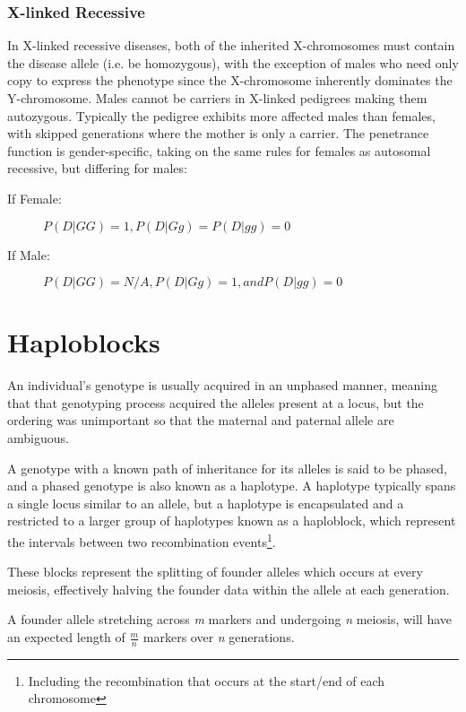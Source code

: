 \subsubsection{X-linked Recessive}

\label{ref:back:xlinkrec}

In X-linked recessive diseases, both of the inherited X-chromosomes must contain the disease allele (i.e. be homozygous), with the exception of males who need only copy to express the phenotype since the X-chromosome inherently dominates the Y-chromosome.  Males cannot be carriers in X-linked pedigrees making them \gls{autozygous}.
Typically the pedigree exhibits more affected males than females, with skipped generations where the mother is only a carrier. 
The penetrance function is gender-specific, taking on the same rules for females as autosomal recessive, but differing for males:

\begin{description}
\item[If Female:]{\(P(D|GG)=1, P(D|Gg) = P(D|gg)=0\)}
\item[If Male:]{\(P(D|GG)=N/A,   P(D|Gg)=1, and P(D|gg)=0\)}
\end{description}


\section{Haploblocks}

An individual's genotype is usually acquired in an \gls{unphased} manner, meaning that that genotyping process acquired the alleles present at a locus, but the ordering was unimportant so that the maternal and paternal allele are ambiguous.

A genotype with a known path of inheritance for its alleles is said to be \gls{phased}, and a phased genotype is also known as a \gls{haplotype}.  A haplotype typically spans a single locus similar to an allele, but a haplotype is encapsulated and a restricted to a larger group of haplotypes known as a \gls{haploblock}, which represent the intervals between two recombination events\footnote{Including the recombination that occurs at the start/end of each chromosome}.

These blocks represent the splitting of founder alleles which occurs at every meiosis, effectively halving the founder data within the allele at each generation. 

A founder allele stretching across \textit{m} markers and undergoing \textit{n} meiosis, will have an expected length of \(\frac{m}{n}\) markers over \textit{n} generations.

